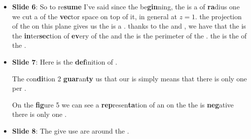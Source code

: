 \begin{itemize}
        \item \textbf{Slide 6}: So to re\textbf{sume}  I've said since the be\textbf{gin}ning, the
             is a  of \textbf{ra}dius
            one  we cut a
             of the \textbf{vec}tor space on top of it, in general at $z=1$.
             the projection of the  on this plane gives us the
             is a .
              thanks to the
             and , we have that the
             is the \textbf{in}ter\textbf{sec}tion of \textbf{ev}ery  of the
             and the 
             is the perimeter of the . 
            the  is the  of the .
        \item \textbf{Slide 7}: Here is the \textbf{def}inition of .

            The con\textbf{di}tion 2 \textbf{guar}an\textbf{ty} us that our  is
              simply means that
            there is only one  per .

            On the \textbf{fig}ure 5 we can see a \textbf{rep}resen\textbf{ta}tion of an 
            on the   the  is
            \textbf{neg}ative  there is only one
            .
        \item \textbf{Slide 8}: The  give use   are  around the
            .


\end{itemize}
